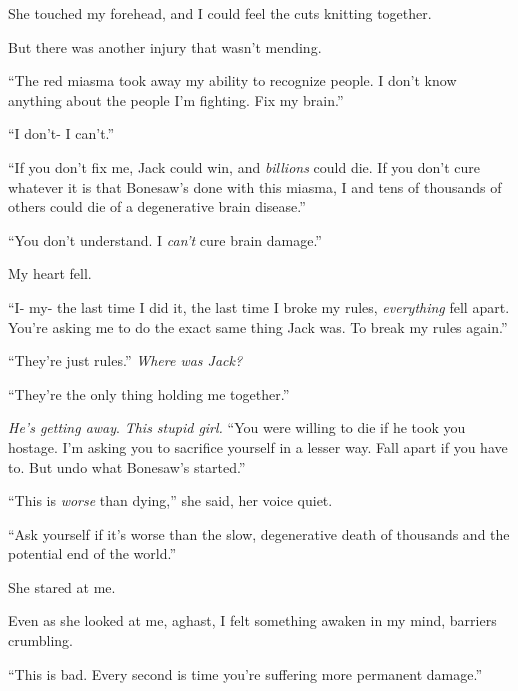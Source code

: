 She touched my forehead, and I could feel the cuts knitting together.



But there was another injury that wasn't mending.



``The red miasma took away my ability to recognize people.  I don't know anything about the people I'm fighting.  Fix my brain.''



``I don't- I can't.''



``If you don't fix me, Jack could win, and \emph{billions} could die.  If you don't cure whatever it is that Bonesaw's done with this miasma, I and tens of thousands of others could die of a degenerative brain disease.''



``You don't understand.  I \emph{can't} cure brain damage.''



My heart fell.



``I- my- the last time I did it, the last time I broke my rules, \emph{everything} fell apart.  You're asking me to do the exact same thing Jack was.  To break my rules again.''



``They're just rules.''  \emph{Where was Jack?}



``They're the only thing holding me together.''



\emph{He's getting away}.  \emph{This stupid girl.}  ``You were willing to die if he took you hostage.  I'm asking you to sacrifice yourself in a lesser way.  Fall apart if you have to.  But undo what Bonesaw's started.''



``This is \emph{worse }than dying,'' she said, her voice quiet.



``Ask yourself if it's worse than the slow, degenerative death of thousands and the potential end of the world.''



She stared at me.



Even as she looked at me, aghast, I felt something awaken in my mind, barriers crumbling.



``This is bad.  Every second is time you're suffering more permanent damage.''



